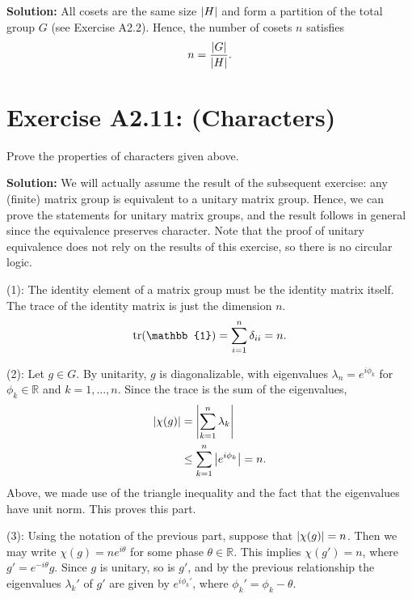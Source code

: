 \documentclass{book}
\begin{document}
    \textbf{Solution:} All cosets are the same size $\abs{H}$ and form a partition of the total group $G$ (see Exercise A2.2). Hence, the number of cosets $n$ satisfies
    \begin{align}
        n = \frac{\abs{G}}{\abs{H}}.
    \end{align}

\section*{Exercise A2.11: (Characters)}
    Prove the properties of characters given above.
    
    \textbf{Solution:} We will actually assume the result of the subsequent exercise: any (finite) matrix group is equivalent to a unitary matrix group. Hence, we can prove the statements for unitary matrix groups, and the result follows in general since the equivalence preserves character. Note that the proof of unitary equivalence does not rely on the results of this exercise, so there is no circular logic. 
    
    (1): The identity element of a matrix group must be the identity matrix itself. The trace of the identity matrix is just the dimension $n$.
    \begin{align}
        \tr(\mathbb{1}) = \sum_{i=1}^n \delta_{ii} = n.
    \end{align}
    
    (2): Let $g\in G$. By unitarity, $g$ is diagonalizable, with eigenvalues $\lambda_n = e^{i\phi_k}$ for $\phi_k\in \mathbb{R}$ and $k=1,...,n$. Since the trace is the sum of the eigenvalues,
    \begin{align}
        \abs{\chi(g)} &= \abs{\sum_{k=1}^n \lambda_k} \\
        &\leq \sum_{k=1}^n \abs{e^{i\phi_k}} = n.
    \end{align}
    Above, we made use of the triangle inequality and the fact that the eigenvalues have unit norm. This proves this part.
    
    (3): Using the notation of the previous part, suppose that $\abs{\chi(g)} = n$. Then we may write $\chi(g) = n e^{i\theta}$ for some phase $\theta\in \mathbb{R}$. This implies $\chi(g') = n$, where $g' = e^{-i\theta} g$. Since $g$ is unitary, so is $g'$, and by the previous relationship the eigenvalues $\lambda_k'$ of $g'$ are given by $e^{i\phi_k'}$, where $\phi_k'=\phi_k-\theta$. 
    
\end{document}
